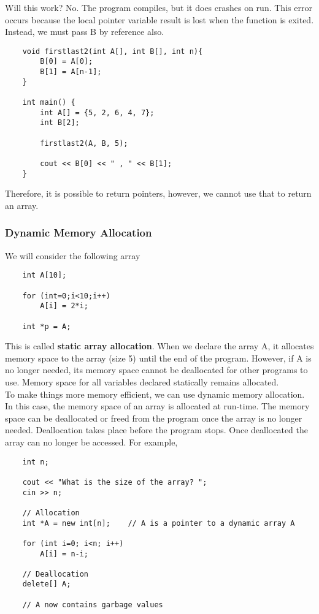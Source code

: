 \documentclass[]{article}
\begin{document}
Will this work? No. The program compiles, but it does crashes on run. This error occurs because the local pointer variable result is lost when the function is exited. Instead, we must pass B by reference also.

\begin{lstlisting}
	void firstlast2(int A[], int B[], int n){
		B[0] = A[0];
		B[1] = A[n-1];
	}
	
	int main() {
		int A[] = {5, 2, 6, 4, 7};
		int B[2];
		
		firstlast2(A, B, 5);
		
		cout << B[0] << " , " << B[1];
	}
\end{lstlisting}\bigbreak

Therefore, it is possible to return pointers, however, we cannot use that to return an array.


\subsubsection{Dynamic Memory Allocation}
\bigbreak

We will consider the following array

\begin{lstlisting}
	int A[10];
	
	for (int=0;i<10;i++)
		A[i] = 2*i;
	
	int *p = A;
\end{lstlisting}

This is called \textbf{static array allocation}. When we declare the array A, it allocates memory space to the array (size 5) until the end of the program. However, if A is no longer needed, its memory space cannot be deallocated for other programs to use. Memory space for all variables declared statically remains allocated.\\

To make things more memory efficient, we can use dynamic memory allocation. In this case, the memory space of an array is allocated at run-time. The memory space can be deallocated or freed from the program once the array is no longer needed. Deallocation takes place before the program stops. Once deallocated the array can no longer be accessed. For example,

\begin{lstlisting}
	int n;
	
	cout << "What is the size of the array? ";
	cin >> n;
	
	// Allocation
	int *A = new int[n];	// A is a pointer to a dynamic array A
	
	for (int i=0; i<n; i++)
		A[i] = n-i;
		
	// Deallocation
	delete[] A;
	
	// A now contains garbage values
\end{lstlisting}
\bigbreak
\end{document}
